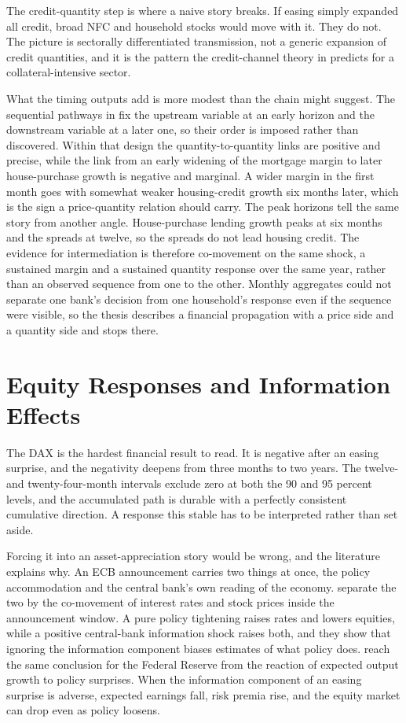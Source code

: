 The credit-quantity step is where a naive story breaks. If easing simply expanded all credit, broad NFC and household stocks would move with it. They do not. The picture is sectorally differentiated transmission, not a generic expansion of credit quantities, and it is the pattern the credit-channel theory in  predicts for a collateral-intensive sector.

What the timing outputs add is more modest than the chain might suggest. The sequential pathways in  fix the upstream variable at an early horizon and the downstream variable at a later one, so their order is imposed rather than discovered. Within that design the quantity-to-quantity links are positive and precise, while the link from an early widening of the mortgage margin to later house-purchase growth is negative and marginal. A wider margin in the first month goes with somewhat weaker housing-credit growth six months later, which is the sign a price-quantity relation should carry. The peak horizons tell the same story from another angle. House-purchase lending growth peaks at six months and the spreads at twelve, so the spreads do not lead housing credit. The evidence for intermediation is therefore co-movement on the same shock, a sustained margin and a sustained quantity response over the same year, rather than an observed sequence from one to the other. Monthly aggregates could not separate one bank's decision from one household's response even if the sequence were visible, so the thesis describes a financial propagation with a price side and a quantity side and stops there.

\section{Equity Responses and Information Effects}

The DAX is the hardest financial result to read. It is negative after an easing surprise, and the negativity deepens from three months to two years. The twelve- and twenty-four-month intervals exclude zero at both the 90 and 95 percent levels, and the accumulated path is durable with a perfectly consistent cumulative direction. A response this stable has to be interpreted rather than set aside.

Forcing it into an asset-appreciation story would be wrong, and the literature explains why. An ECB announcement carries two things at once, the policy accommodation and the central bank's own reading of the economy. \textcite{JarocinskiKaradi2020} separate the two by the co-movement of interest rates and stock prices inside the announcement window. A pure policy tightening raises rates and lowers equities, while a positive central-bank information shock raises both, and they show that ignoring the information component biases estimates of what policy does. \textcite{NakamuraSteinsson2018} reach the same conclusion for the Federal Reserve from the reaction of expected output growth to policy surprises. When the information component of an easing surprise is adverse, expected earnings fall, risk premia rise, and the equity market can drop even as policy loosens.

